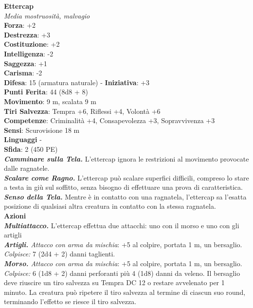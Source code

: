 \begin{multicols}{2}
\medskip\textbf{Ettercap}\\
\emph{Media mostruosità, malvagio}\\
\textbf{Forza}: +2\\
\textbf{Destrezza}: +3\\
\textbf{Costituzione}: +2\\
\textbf{Intelligenza}: -2\\
\textbf{Saggezza}: +1\\
\textbf{Carisma}: -2\\
\textbf{Difesa}: 15 (armatura naturale) - \textbf{Iniziativa}: +3\\
\textbf{Punti Ferita}: 44 (8d8 + 8)\\
\textbf{Movimento}: 9 m, scalata 9 m\\
\textbf{Tiri Salvezza}: Tempra +6, Riflessi +4, Volontà +6\\
\textbf{Competenze}: Criminalità +4, Consapevolezza +3, Sopravvivenza +3\\
\textbf{Sensi}: Scurovisione 18 m\\
\textbf{Linguaggi} -\\
\textbf{Sfida}: 2 (450 PE)\smallskip\\
\emph{\textbf{Camminare sulla Tela.}} L'ettercap ignora le restrizioni al movimento provocate dalle ragnatele.\\
\emph{\textbf{Scalare come Ragno.}} L'ettercap può scalare superfici difficili, compreso lo stare a testa in giù sul soffitto, senza bisogno di effettuare una prova di caratteristica.\\
\emph{\textbf{Senso della Tela.}} Mentre è in contatto con una ragnatela, l'ettercap sa l'esatta posizione di qualsiasi altra creatura in contatto con la stessa ragnatela.\\
\smallskip\textbf{Azioni}\\
\emph{\textbf{Multiattacco.}} L'ettercap effettua due attacchi: uno con il morso e uno con gli artigli\\
\emph{\textbf{Artigli.} Attacco con arma da mischia}: +5 al colpire, portata 1 m, un bersaglio.\\
\emph{Colpisce:} 7 (2d4 + 2) danni taglienti.\\
\emph{\textbf{Morso.} Attacco con arma da mischia}: +5 al colpire, portata 1 m, un bersaglio.\\
\emph{Colpisce:} 6 (1d8 + 2) danni perforanti più 4 (1d8) danni da veleno. Il bersaglio deve riuscire un tiro salvezza su Tempra DC  12 o restare avvelenato per 1 minuto. La creatura può ripetere il tiro salvezza al termine di ciascun suo round, terminando l'effetto se riesce il tiro salvezza.\\

\end{multicols}
